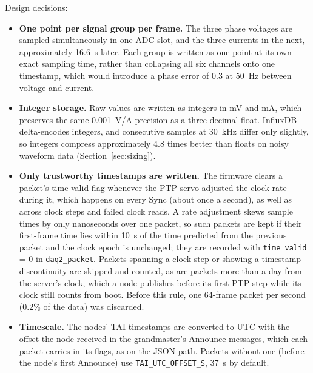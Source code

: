 Design decisions:
\begin{itemize}[noitemsep]
  \item \textbf{One point per signal group per frame.} The three phase voltages are sampled simultaneously in one ADC slot, and the three currents in the next, approximately 16.6~\textmu s later. Each group is written as one point at its own exact sampling time, rather than collapsing all six channels onto one timestamp, which would introduce a phase error of 0.3\textdegree{} at 50~Hz between voltage and current.
  \item \textbf{Integer storage.} Raw values are written as integers in mV and mA, which preserves the same 0.001~V/A precision as a three-decimal float. InfluxDB delta-encodes integers, and consecutive samples at 30~kHz differ only slightly, so integers compress approximately 4.8 times better than floats on noisy waveform data (Section~\ref{sec:sizing}).
  \item \textbf{Only trustworthy timestamps are written.} The firmware clears a packet's time-valid flag whenever the PTP servo adjusted the clock rate during it, which happens on every Sync (about once a second), as well as across clock steps and failed clock reads. A rate adjustment skews sample times by only nanoseconds over one packet, so such packets are kept if their first-frame time lies within 10~\textmu s of the time predicted from the previous packet and the clock epoch is unchanged; they are recorded with \texttt{time\_valid} = 0 in \texttt{daq2\_packet}. Packets spanning a clock step or showing a timestamp discontinuity are skipped and counted, as are packets more than a day from the server's clock, which a node publishes before its first PTP step while its clock still counts from boot. Before this rule, one 64-frame packet per second (0.2\% of the data) was discarded.
  \item \textbf{Timescale.} The nodes' TAI timestamps are converted to UTC with the offset the node received in the grandmaster's Announce messages, which each packet carries in its flags, as on the JSON path. Packets without one (before the node's first Announce) use \texttt{TAI\_UTC\_OFFSET\_S}, 37~s by default.
\end{itemize}

